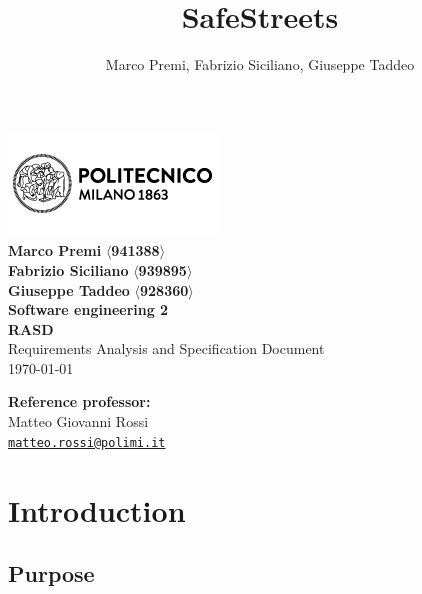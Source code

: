 \documentclass{article}
\title{SafeStreets}
\author{Marco Premi, Fabrizio Siciliano, Giuseppe Taddeo}
\begin{document}
\begin{center}
    \includegraphics[width=0.5\linewidth]{Images/logo_polimi.png}\\[4ex]
    \begingroup
        \huge \textbf{Marco Premi} $\langle$\textbf{941388}$\rangle$ \\
        \vfill
        \huge \textbf{Fabrizio Siciliano} $\langle$\textbf{939895}$\rangle$\\
        \vfill
        \huge \textbf{Giuseppe Taddeo} $\langle$\textbf{928360}$\rangle$\\
        \vfill
    \endgroup
    \vfill
    \begingroup
        \fontsize{15pt}{12pt}\selectfont
        \textbf{Software engineering 2}
    \endgroup\\[3ex]
    \begingroup
        \fontsize{20pt}{12pt}\selectfont
        \textbf{RASD}\\[1ex]
        \fontsize{15pt}{12pt}\selectfont
        Requirements Analysis and Specification Document
    \endgroup\\[8ex]
    \normalsize \today\\
\end{center}

\vspace*{\fill}
\begin{flushright}
    \textbf{Reference professor:}\\[0.2cm]
    Matteo Giovanni Rossi\\[0cm]
    {\small \href{mailto:matteo.rossi@polimi.it}{\texttt{matteo.rossi@polimi.it}}}
\end{flushright}

\newpage
\tableofcontents

\newpage
\section{Introduction}
\subsection{Purpose}
\end{document}
